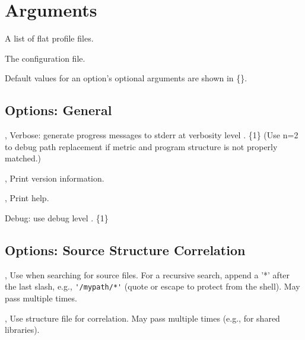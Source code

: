 \documentclass[english]{article}
\begin{document}
\section{Arguments}

\begin{Description}
\item[\Arg{profile-file...}] A list of flat profile files.
\item[\Arg{config-file}] The  configuration file.
\end{Description}

Default values for an option's optional arguments are shown in \{\}.

\subsection{Options: General}

\begin{Description}
\item[\OptoArg{-v}{n}, \OptoArg{--verbose}{n}] Verbose: generate progress messages to stderr at verbosity level .  \{1\}  (Use n=2 to debug path replacement if metric and program structure is not properly matched.)
\item[\Opt{-V}, \Opt{--version}] Print version information.
\item[\Opt{-h}, \Opt{--help}] Print help.
\item[\OptoArg{--debug}{n}]   Debug: use debug level . \{1\}
\end{Description}

\subsection{Options: Source Structure Correlation}

\begin{Description}
\item[\OptArg{-I}{path}, \OptArg{--include}{path}] 
Use  when searching for source files. For a recursive search, append a '*' after the last slash, e.g., \verb+'/mypath/*'+ (quote or escape to protect from the shell). May pass multiple times.

\item[\OptArg{-S}{file}, \OptArg{--structure}{file}] 
Use  structure file  for correlation.  May pass multiple times (e.g., for shared libraries).
\end{Description}
\end{document}
